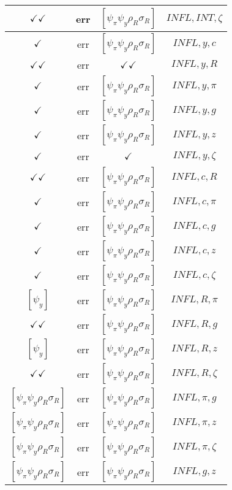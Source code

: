 \documentclass[a4paper,10pt]{article}
\begin{document}
\begin{longtable}{|c|c|c|c|}
\hline
$\checkmark\checkmark$ & err & $[\psi_\pi \psi_y \rho_R \sigma_R ]$ & ${INFL},{INT},{\zeta}$ \\
\hline
$\checkmark$ & err & $[\psi_\pi \psi_y \rho_R \sigma_R ]$ & ${INFL},{y},{c}$ \\
\hline
$\checkmark\checkmark$ & err & $\checkmark\checkmark$ & ${INFL},{y},{R}$ \\
\hline
$\checkmark$ & err & $[\psi_\pi \psi_y \rho_R \sigma_R ]$ & ${INFL},{y},{\pi}$ \\
\hline
$\checkmark$ & err & $[\psi_\pi \psi_y \rho_R \sigma_R ]$ & ${INFL},{y},{g}$ \\
\hline
$\checkmark$ & err & $[\psi_\pi \psi_y \rho_R \sigma_R ]$ & ${INFL},{y},{z}$ \\
\hline
$\checkmark$ & err & $\checkmark$ & ${INFL},{y},{\zeta}$ \\
\hline
$\checkmark\checkmark$ & err & $[\psi_\pi \psi_y \rho_R \sigma_R ]$ & ${INFL},{c},{R}$ \\
\hline
$\checkmark$ & err & $[\psi_\pi \psi_y \rho_R \sigma_R ]$ & ${INFL},{c},{\pi}$ \\
\hline
$\checkmark$ & err & $[\psi_\pi \psi_y \rho_R \sigma_R ]$ & ${INFL},{c},{g}$ \\
\hline
$\checkmark$ & err & $[\psi_\pi \psi_y \rho_R \sigma_R ]$ & ${INFL},{c},{z}$ \\
\hline
$\checkmark$ & err & $[\psi_\pi \psi_y \rho_R \sigma_R ]$ & ${INFL},{c},{\zeta}$ \\
\hline
$[\psi_y ]$ & err & $[\psi_\pi \psi_y \rho_R \sigma_R ]$ & ${INFL},{R},{\pi}$ \\
\hline
$\checkmark\checkmark$ & err & $[\psi_\pi \psi_y \rho_R \sigma_R ]$ & ${INFL},{R},{g}$ \\
\hline
$[\psi_y ]$ & err & $[\psi_\pi \psi_y \rho_R \sigma_R ]$ & ${INFL},{R},{z}$ \\
\hline
$\checkmark\checkmark$ & err & $[\psi_\pi \psi_y \rho_R \sigma_R ]$ & ${INFL},{R},{\zeta}$ \\
\hline
$[\psi_\pi \psi_y \rho_R \sigma_R ]$ & err & $[\psi_\pi \psi_y \rho_R \sigma_R ]$ & ${INFL},{\pi},{g}$ \\
\hline
$[\psi_\pi \psi_y \rho_R \sigma_R ]$ & err & $[\psi_\pi \psi_y \rho_R \sigma_R ]$ & ${INFL},{\pi},{z}$ \\
\hline
$[\psi_\pi \psi_y \rho_R \sigma_R ]$ & err & $[\psi_\pi \psi_y \rho_R \sigma_R ]$ & ${INFL},{\pi},{\zeta}$ \\
\hline
$[\psi_\pi \psi_y \rho_R \sigma_R ]$ & err & $[\psi_\pi \psi_y \rho_R \sigma_R ]$ & ${INFL},{g},{z}$ \\

\end{longtable}
\end{document}
